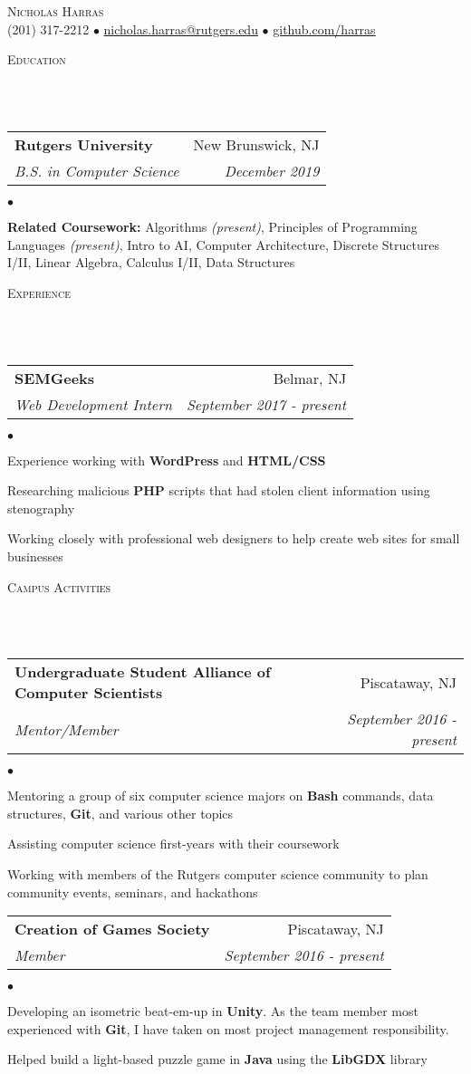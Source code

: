 \documentclass[12pt]{article}
\makeatletter
\newcommand{\lineunder}{
	\vspace*{-8pt} \\ 
	\hspace*{-18pt} 
	\hrulefill \\
}
\newcommand{\header}[1]{
	\vspace*{2pt}
	{\hspace*{-14pt}\vspace*{6pt} \textsc{#1}} 
	\vspace*{-6pt} 
	\lineunder
}
\newcommand{\contact}[2]{
	\vspace*{-8pt}
	\begin{center}
		{\LARGE \scshape {#1}}\\
		#2
	\end{center}
	\vspace*{-8pt}
}
\newenvironment{achievements}{
  \begin{list}{$\bullet$}{
  	\topsep 0pt \itemsep -4pt}}
  	{\vspace*{2pt}\end{list}
}
\newcommand{\mailto}[1]{
	\href{mailto:#1}{#1}}
\newcommand{\subheading}[4]{
 	\vspace{5pt}
    	\begin{tabular*}{1.01\textwidth}{l@{\extracolsep{\fill}}r}
      		\textbf{#1} & #2 \\
      		\textit{\small#3} & \textit{\small #4} \\
    	\end{tabular*}\vspace{-5pt}
}
\makeatother
\begin{document}
\small
\smallskip
\vspace*{-44pt}

\contact{Nicholas Harras}{(201) 317-2212 $\bullet$ \mailto{nicholas.harras@rutgers.edu} $\bullet$ \href{https://www.github.com/harras}{github.com/harras}}

\header{Education}

\subheading
	{Rutgers University}{New Brunswick, NJ}
	{B.S. in Computer Science}{December 2019}
	\begin{achievements}	
	\item{\bf Related Coursework:} Algorithms \textit{(present)}, Principles of Programming Languages \textit{(present)}, Intro to AI, Computer Architecture, Discrete Structures I/II, Linear Algebra, Calculus I/II, Data Structures
	\end{achievements}

\header{Experience}

\subheading
	{SEMGeeks}{Belmar, NJ}
	{Web Development Intern}{September 2017 - \textit{present}}
	\begin{achievements}
		\item Experience working with \textbf{WordPress} and \textbf{HTML/CSS}
		\item Researching malicious \textbf{PHP} scripts that had stolen client information using stenography
		\item Working closely with professional web designers to help create web sites for small businesses
	\end{achievements}

\header{Campus Activities}

\subheading
	{Undergraduate Student Alliance of Computer Scientists}{Piscataway, NJ}
	{Mentor/Member}{September 2016 - \textit{present}}
	\begin{achievements}
		\item Mentoring a group of six computer science majors on \textbf{Bash} commands, data structures, \textbf{Git}, and various other topics
		\item Assisting computer science first-years with their coursework
		\item Working with members of the Rutgers computer science community to plan community events, seminars, and hackathons
	\end{achievements}
	
\subheading
	{Creation of Games Society}{Piscataway, NJ}
	{Member}{September 2016 - \textit{present}}
	\begin{achievements}
		\item Developing an isometric beat-em-up in \textbf{Unity}. As the team member most experienced with \textbf{Git}, I have taken on most project management responsibility. 
		\item Helped build a light-based puzzle game in \textbf{Java} using the \textbf{LibGDX} library
	\end{achievements}
	
\end{document}

